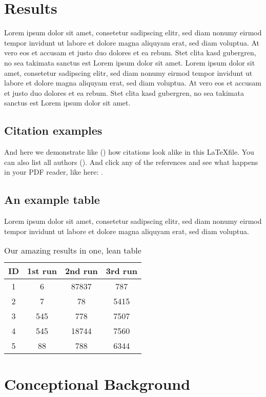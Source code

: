 \section{Results}
Lorem ipsum dolor sit amet, consetetur sadipscing elitr, sed diam nonumy eirmod tempor invidunt ut labore et dolore magna aliquyam erat, sed diam voluptua. At vero eos et accusam et justo duo dolores et ea rebum. Stet clita kasd gubergren, no sea takimata sanctus est Lorem ipsum dolor sit amet. Lorem ipsum dolor sit amet, consetetur sadipscing elitr, sed diam nonumy eirmod tempor invidunt ut labore et dolore magna aliquyam erat, sed diam voluptua. At vero eos et accusam et justo duo dolores et ea rebum. Stet clita kasd gubergren, no sea takimata sanctus est Lorem ipsum dolor sit amet.

\subsection{Citation examples}
And here we demonstrate like (\cite{hoehle_espoused_2015}) how citations look alike in this \LaTeX file. You can also list all authors (\cite{venkatesh_usability_2014}). And click any of the references and see what happens in your PDF reader, like here: \cite{university_of_arkansas_mobile_2015}.

\subsection{An example table}
Lorem ipsum dolor sit amet, consetetur sadipscing elitr, sed diam nonumy eirmod tempor invidunt ut labore et dolore magna aliquyam erat, sed diam voluptua. 

\begin{table}[h!]
\centering
\begin{tabular}{|c|c|c|c|} 
 \hline
ID & 1st run & 2nd run & 3rd run \\ [0.5ex] 
 \hline
 1 & 6 & 87837 & 787 \\ 
 \hline
 2 & 7 & 78 & 5415 \\
 \hline
 3 & 545 & 778 & 7507 \\
 \hline
 4 & 545 & 18744 & 7560 \\
 \hline
 5 & 88 & 788 & 6344 \\ 
 \hline
\end{tabular}
\caption{Our amazing results in one, lean table}
\label{table:1}
\end{table}

\section{Conceptional Background}


